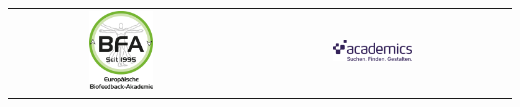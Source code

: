 \begin{table}[H]
\begin{tabular}{ c c }
        \includegraphics[width=0.3\textwidth]{tex/images/sponsors/BFA.png} & \hspace*{1cm} \vspace*{0.5cm}
        \includegraphics[width=0.3\textwidth]{tex/images/sponsors/academics.png} \\     
    \end{tabular}
\end{table}

\vfill

\newpage

